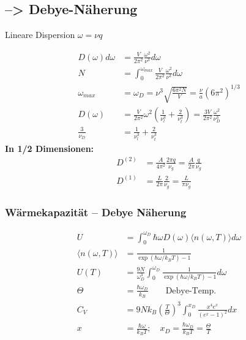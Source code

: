 \subsection*{--> Debye-Näherung}
Lineare Dispersion $\omega = \nu q$

\begin{equation*}
    \begin{aligned}
        D(\omega)d \omega &= \frac{V}{2 \pi^2} \frac{\omega^2}{\nu^3} d\omega  \\
        N &= \int_0^{\omega_{max}} \frac{V}{2 \pi^2} \frac{\omega^2}{\nu^3} d\omega \\
        \omega_{max} &= \omega_D = \nu^3 \sqrt{\frac{6 \pi^2 N}{V}} = \frac{\nu}{a} \left(6 \pi^2\right)^{1/3} \\
        D(\omega) &= \frac{V}{2 \pi^2} \omega^2 \left(\frac{1}{\nu_l^3} + \frac{2}{\nu_t^3}\right) = \frac{3 V}{2 \pi^2} \frac{\omega^2}{\nu_D^3} \\
        \frac{3}{\nu_D} &= \frac{1}{\nu_l^3} + \frac{2}{\nu_t^3}
    \end{aligned}
\end{equation*}
\textbf{In 1/2 Dimensionen:}
\begin{equation*}
    \begin{aligned}
        D^{(2)} &= \frac{A}{4 \pi^2} \frac{2 \pi q}{\nu_g} = \frac{A}{2 \pi} \frac{q}{\nu_g} \\
        D^{(1)} &= \frac{L}{2 \pi} \frac{2}{\nu_g} = \frac{L}{\pi \nu_g}
    \end{aligned}
\end{equation*}

\subsubsection*{Wärmekapazität – Debye Näherung}
\begin{equation*}
    \begin{aligned}
        U &= \int_0^{\omega_D} \hbar \omega D(\omega) \langle n(\omega, T) \rangle d\omega \\
        \langle n(\omega,T) \rangle &= \frac{1}{\exp(\hbar \omega / k_B T) -1} \\
        U(T) &= \frac{9N}{\omega_D^3} \int_0^{\omega_D} \frac{1}{\exp(\hbar \omega / k_B T) -1} d\omega \\
        \Theta &= \frac{\hbar \omega_D}{k_B} \qquad \text{Debye-Temp.} \\
        C_V &= 9Nk_B \left(\frac{T}{\Theta}\right)^3 \int_0^{x_D} \frac{x^4 e^x}{(e^x -1)^2} dx \\
        x &= \frac{\hbar \omega}{k_B T}; \quad x_D = \frac{\hbar \omega_D}{k_B T} = \frac{\Theta}{T}
    \end{aligned}
\end{equation*}

